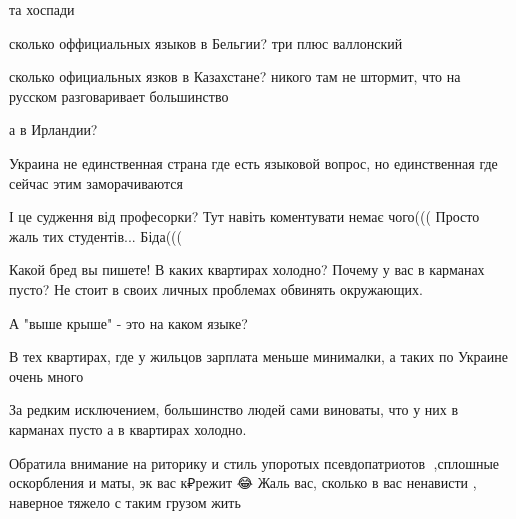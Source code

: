 \begin{itemize}
\begin{itemize}

та хоспади

сколько оффициальных языков в Бельгии? три плюс валлонский

сколько официальных язков в Казахстане? никого там не штормит, что на русском
разговаривает большинство

а в Ирландии?

Украина не единственная страна где есть языковой вопрос, но единственная где
сейчас этим заморачиваются
\end{itemize}


І це судження від професорки? Тут навіть коментувати немає чого((( Просто жаль
тих студентів... Біда(((


Какой бред вы пишете! В каких квартирах холодно? Почему у вас в карманах пусто?
Не стоит в своих личных проблемах обвинять окружающих.

А "выше крыше" - это на каком языке?

\begin{itemize}

В тех квартирах, где у жильцов зарплата меньше минималки, а таких по Украине очень много

За редким исключением, большинство людей сами виноваты, что у них в карманах пусто а в квартирах холодно.
\end{itemize}



Обратила внимание на риторику и стиль упоротых псевдопатриотов 🤔,сплошные
оскорбления и маты, эк вас к₽режит 😂 Жаль вас, сколько в вас ненависти ,
наверное тяжело с таким грузом жить

\begin{itemize}


\end{itemize}
\end{itemize}
